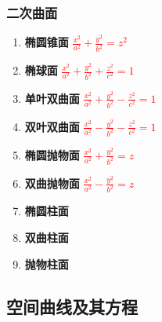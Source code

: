 \documentclass{article} %
\begin{document}
\subsubsection{二次曲面}
\begin{enumerate}
    \item \textbf{椭圆锥面}\hspace{2mm}
    \textcolor{red}{$\displaystyle\frac{x^2}{a^2}+\frac{y^2}{b^2}=z^2$}

    \item \textbf{椭球面}\hspace{2mm}
    \textcolor{red}{$\displaystyle\frac{x^2}{a^2}+\frac{y^2}{b^2}+\frac{z^2}{c^2}=1$}

    \item \textbf{单叶双曲面}\hspace{2mm}
    \textcolor{red}{$\displaystyle\frac{x^2}{a^2}+\frac{y^2}{b^2}-\frac{z^2}{c^2}=1$}

    \item \textbf{双叶双曲面}\hspace{2mm}
    \textcolor{red}{$\displaystyle\frac{x^2}{a^2}-\frac{y^2}{b^2}-\frac{z^2}{c^2}=1$}

    \item \textbf{椭圆抛物面}\hspace{2mm}
    \textcolor{red}{$\displaystyle\frac{x^2}{a^2}+\frac{y^2}{b^2}=z$}

    \item \textbf{双曲抛物面}\hspace{2mm}
    \textcolor{red}{$\displaystyle\frac{x^2}{a^2}-\frac{y^2}{b^2}=z$}

    \item \textbf{椭圆柱面}
    \item \textbf{双曲柱面}
    \item \textbf{抛物柱面}
\end{enumerate}

\subsection{空间曲线及其方程}
\end{document}
